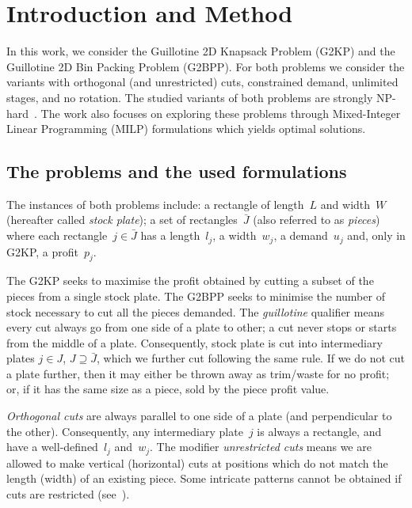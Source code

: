 \documentclass[9pt]{entcs}
\begin{document}
\section{Introduction and Method}\label{intro}

In this work, we consider the Guillotine 2D Knapsack Problem (G2KP) and the Guillotine 2D Bin Packing Problem (G2BPP).
For both problems we consider the variants with orthogonal (and unrestricted) cuts, constrained demand, unlimited stages, and no rotation.
The studied variants of both problems are strongly NP-hard~\cite{martello:1998,russo:2020}.
The work also focuses on exploring these problems through Mixed-Integer Linear Programming (MILP) formulations which yields optimal solutions.

\subsection{The problems and the used formulations}

The instances of both problems include: a rectangle of length~\(L\) and width~\(W\) (hereafter called \emph{stock plate}); a set of rectangles~\(\bar{J}\) (also referred to as \emph{pieces}) where each rectangle~\(j \in \bar{J}\) has a length~\(l_j\), a width~\(w_j\), a demand~\(u_j\) and, only in G2KP, a profit~\(p_j\).

The G2KP seeks to maximise the profit obtained by cutting a subset of the pieces from a single stock plate.
The G2BPP seeks to minimise the number of stock necessary to cut all the pieces demanded.
The \emph{guillotine} qualifier means every cut always go from one side of a plate to other; a cut never stops or starts from the middle of a plate. %
Consequently, stock plate is cut into intermediary plates \(j \in J\), \(J \supseteq \bar{J}\), which we further cut following the same rule.
If we do not cut a plate further, then it may either be thrown away as trim/waste for no profit; or, if it has the same size as a piece, sold by the piece profit value.

\emph{Orthogonal cuts} are always parallel to one side of a plate (and perpendicular to the other).
Consequently, any intermediary plate~\(j\) is always a rectangle, and have a well-defined~\(l_j\) and~\(w_j\).
The modifier \emph{unrestricted cuts} means we are allowed to make vertical (horizontal) cuts at positions which do not match the length (width) of an existing piece.
Some intricate patterns cannot be obtained if cuts are restricted (see~\cite{puchinger:2007}).
\end{document}
